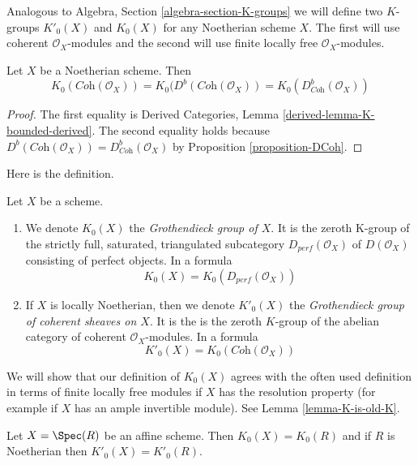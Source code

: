 \medskip\noindent
Analogous to Algebra, Section \ref{algebra-section-K-groups}
we will define two $K$-groups $K'_0(X)$ and $K_0(X)$ for any
Noetherian scheme $X$. The first will use coherent $\mathcal{O}_X$-modules
and the second will use finite locally free $\mathcal{O}_X$-modules.

\begin{lemma}
\label{lemma-Noetherian-Kprime}
Let $X$ be a Noetherian scheme. Then
$$
K_0(\textit{Coh}(\mathcal{O}_X)) =
K_0(D^b(\textit{Coh}(\mathcal{O}_X)) =
K_0(D^b_{\textit{Coh}}(\mathcal{O}_X))
$$
\end{lemma}

\begin{proof}
The first equality is
Derived Categories, Lemma \ref{derived-lemma-K-bounded-derived}.
The second equality holds because
$D^b(\textit{Coh}(\mathcal{O}_X)) = D^b_{\textit{Coh}}(\mathcal{O}_X)$
by Proposition \ref{proposition-DCoh}.
\end{proof}

\noindent
Here is the definition.

\begin{definition}
\label{definition-K-group}
Let $X$ be a scheme.
\begin{enumerate}
\item We denote $K_0(X)$ the {\it Grothendieck group of $X$}. It is the
zeroth K-group of the strictly full, saturated, triangulated subcategory
$D_{perf}(\mathcal{O}_X)$ of $D(\mathcal{O}_X)$ consisting of perfect objects.
In a formula
$$
K_0(X) = K_0(D_{perf}(\mathcal{O}_X))
$$
\item If $X$ is locally Noetherian, then we denote $K'_0(X)$ the
{\it Grothendieck group of coherent sheaves on $X$}. It is the
is the zeroth $K$-group of the abelian category
of coherent $\mathcal{O}_X$-modules. In a formula
$$
K'_0(X) = K_0(\textit{Coh}(\mathcal{O}_X))
$$
\end{enumerate}
\end{definition}

\noindent
We will show that our definition of $K_0(X)$ agrees with the often used
definition in terms of finite locally free modules if $X$ has the
resolution property (for example if $X$ has an ample invertible module).
See Lemma \ref{lemma-K-is-old-K}.

\begin{lemma}
\label{lemma-K-agrees-affine}
Let $X = \Spec(R)$ be an affine scheme. Then $K_0(X) = K_0(R)$
and if $R$ is Noetherian then $K'_0(X) = K'_0(R)$.
\end{lemma}

